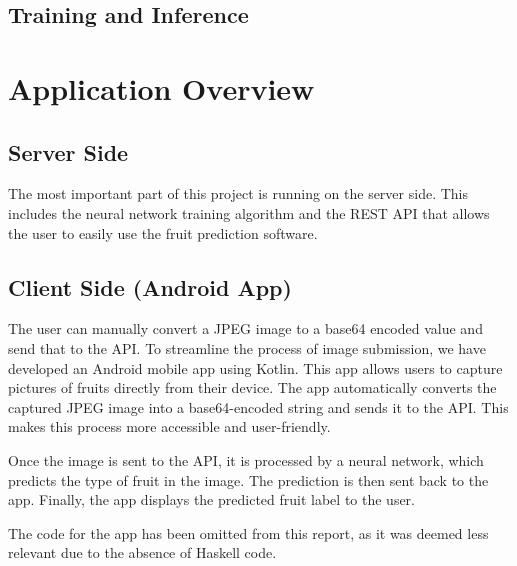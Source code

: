 \documentclass[12pt,a4paper]{article}
\begin{document}
\subsection{Training and Inference}

% 




\section{Application Overview}

\subsection{Server Side}
The most important part of this project is running on the server side. This includes the neural network training algorithm and the REST API that allows the user to easily use the fruit prediction software.

\subsection{Client Side (Android App)}
The user can manually convert a JPEG image to a base64 encoded value and send that to the API.
To streamline the process of image submission, we have developed an Android mobile app using Kotlin. This app allows users to capture pictures of fruits directly from their device. The app automatically converts the captured JPEG image into a base64-encoded string and sends it to the API. This makes this process more accessible and user-friendly.

Once the image is sent to the API, it is processed by a neural network, which predicts the type of fruit in the image. The prediction is then sent back to the app. Finally, the app displays the predicted fruit label to the user.

The code for the app has been omitted from this report, as it was deemed less relevant due to the absence of Haskell code.



% 

% 

% 

% 

% 





\end{document}
